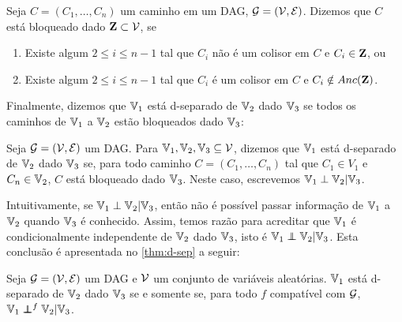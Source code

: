 \begin{definition}
 \label{def:caminho-bloq}
 Seja $C = (C_1,\ldots,C_n)$ um caminho 
 em um DAG, ${\mathcal G} = ({\mathcal V},{\mathcal E})$.
 Dizemos que $C$ está bloqueado dado ${\mathbf{Z}} \subset {\mathcal V}$, se
 \begin{enumerate}
  \item Existe algum $2 \leq i \leq n-1$ tal que
  $C_i$ não é um colisor em $C$ e $C_{i} \in {\mathbf{Z}}$, ou
  \item Existe algum $2 \leq i \leq n-1$ tal que 
  $C_i$ é um colisor em $C$ e $C_{i} \notin Anc({\mathbf{Z}})$.
 \end{enumerate}
\end{definition}

Finalmente, dizemos que ${\mathbb V}_1$ está d-separado de ${\mathbb V}_2$
dado ${\mathbb V}_3$ se todos os caminhos de 
${\mathbb V}_1$ a ${\mathbb V}_2$ estão bloqueados dado ${\mathbb V}_3$:

\begin{definition}
 \label{def:d-sep}
 Seja ${\mathcal G} = ({\mathcal V}, {\mathcal E})$ um DAG. 
 Para ${\mathbb V}_1,{\mathbb V}_2,{\mathbb V}_3 \subseteq {\mathcal V}$, dizemos que
 ${\mathbb V}_1$ está d-separado de ${\mathbb V}_2$ dado ${\mathbb V}_3$ se,
 para todo caminho $C = (C_1,\ldots,C_n)$ tal que
 $C_1 \in V_1$ e $C_n \in {\mathbb V}_2$,
 $C$ está bloqueado dado ${\mathbb V}_3$.
 Neste caso, escrevemos ${\mathbb V}_1 \perp {\mathbb V}_2 | {\mathbb V}_3$.
\end{definition}

Intuitivamente, se ${\mathbb V}_1 \perp {\mathbb V}_2 | {\mathbb V}_3$, então 
não é possível passar informação de ${\mathbb V}_1$ a ${\mathbb V}_2$ quando
${\mathbb V}_3$ é conhecido.
Assim, temos razão para acreditar que
${\mathbb V}_1$ é condicionalmente independente de ${\mathbb V}_2$ dado ${\mathbb V}_3$,
isto é ${\mathbb V}_1 \perp\!\!\!\!\perp {\mathbb V}_2 | {\mathbb V}_3$.
Esta conclusão é apresentada no 
\cref{thm:d-sep} a seguir:

\begin{theorem}
 \label{thm:d-sep}
 Seja ${\mathcal G} = ({\mathcal V}, {\mathcal E})$ um DAG e
 ${\mathcal V}$ um conjunto de variáveis aleatórias.
 ${\mathbb V}_1$ está d-separado de ${\mathbb V}_2$ dado ${\mathbb V}_3$
 se e somente se, para todo $f$ compatível com ${\mathcal G}$,
 ${\mathbb V}_1 \perp\!\!\!\!\perp^f {\mathbb V}_2 | {\mathbb V}_3$.
\end{theorem}

